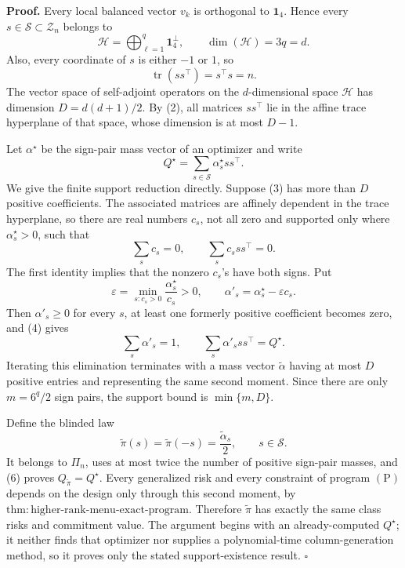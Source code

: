 \textbf{Proof.}
Every local balanced vector \(v_k\) is orthogonal to \(\mathbf1_4\). Hence every \(s\in\mathscr S\subset\mathcal Z_n\) belongs to
\[
\mathcal H=\bigoplus_{\ell=1}^q\mathbf1_4^\perp,
\qquad
\dim(\mathcal H)=3q=d.
\tag{1}
\]
Also, every coordinate of \(s\) is either \(-1\) or \(1\), so
\[
\operatorname{tr}(ss^\top)=s^\top s=n.
\tag{2}
\]
The vector space of self-adjoint operators on the \(d\)-dimensional space \(\mathcal H\) has dimension \(D=d(d+1)/2\). By (2), all matrices \(ss^\top\) lie in the affine trace hyperplane of that space, whose dimension is at most \(D-1\).

Let \(\alpha^\star\) be the sign-pair mass vector of an optimizer and write
\[
Q^\star=\sum_{s\in\mathscr S}\alpha_s^\star ss^\top.
\tag{3}
\]
We give the finite support reduction directly. Suppose (3) has more than \(D\) positive coefficients. The associated matrices are affinely dependent in the trace hyperplane, so there are real numbers \(c_s\), not all zero and supported only where \(\alpha_s^\star>0\), such that
\[
\sum_sc_s=0,
\qquad
\sum_sc_sss^\top=0.
\tag{4}
\]
The first identity implies that the nonzero \(c_s\)'s have both signs. Put
\[
\varepsilon=\min_{s:c_s>0}\frac{\alpha_s^\star}{c_s}>0,
\qquad
\alpha'_s=\alpha_s^\star-\varepsilon c_s.
\tag{5}
\]
Then \(\alpha'_s\ge0\) for every \(s\), at least one formerly positive coefficient becomes zero, and (4) gives
\[
\sum_s\alpha'_s=1,
\qquad
\sum_s\alpha'_sss^\top=Q^\star.
\tag{6}
\]
Iterating this elimination terminates with a mass vector \(\widetilde\alpha\) having at most \(D\) positive entries and representing the same second moment. Since there are only \(m=6^q/2\) sign pairs, the support bound is \(\min\{m,D\}\).

Define the blinded law
\[
\widetilde\pi(s)=\widetilde\pi(-s)=\frac{\widetilde\alpha_s}{2},
\qquad s\in\mathscr S.
\tag{7}
\]
It belongs to \(\Pi_n\), uses at most twice the number of positive sign-pair masses, and (6) proves \(Q_{\widetilde\pi}=Q^\star\). Every generalized risk and every constraint of program \((\mathrm P)\) depends on the design only through this second moment, by \(\mathrm{thm:higher\text{-}rank\text{-}menu\text{-}exact\text{-}program}\). Therefore \(\widetilde\pi\) has exactly the same class risks and commitment value. The argument begins with an already-computed \(Q^\star\); it neither finds that optimizer nor supplies a polynomial-time column-generation method, so it proves only the stated support-existence result. \(\square\)